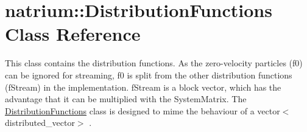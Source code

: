 \hypertarget{classnatrium_1_1DistributionFunctions}{
\section{natrium::DistributionFunctions Class Reference}
\label{classnatrium_1_1DistributionFunctions}
}


This class contains the distribution functions. As the zero-\/velocity particles (f0) can be ignored for streaming, f0 is split from the other distribution functions (fStream) in the implementation. fStream is a block vector, which has the advantage that it can be multiplied with the SystemMatrix. The \hyperlink{classnatrium_1_1DistributionFunctions}{DistributionFunctions} class is designed to mime the behaviour of a vector$<$distributed\_\-vector$>$ .  



